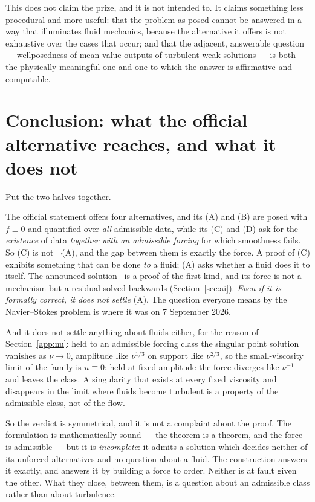\documentclass[11pt]{article}
\begin{document}
This does not claim the prize, and it is not intended to. It claims something less procedural and
more useful: that the problem as posed cannot be answered in a way that illuminates fluid mechanics,
because the alternative it offers is not exhaustive over the cases that occur; and that the
adjacent, answerable question --- wellposedness of mean-value outputs of turbulent weak solutions
--- is both the physically meaningful one and one to which the answer is affirmative and
computable.


\appendix


\section{Conclusion: what the official alternative reaches, and what it does not}

Put the two halves together.

The official statement offers four alternatives, and its (A) and (B) are posed with $f\equiv0$ and
quantified over \emph{all} admissible data, while its (C) and (D) ask for the \emph{existence} of
data \emph{together with an admissible forcing} for which smoothness fails. So (C) is not
$\neg$(A), and the gap between them is exactly the force. A proof of (C) exhibits something that can
be done \emph{to} a fluid; (A) asks whether a fluid does it to itself. The announced
solution~\cite{openai} is a proof of the first kind, and its force is not a mechanism but a residual
solved backwards (Section~\ref{sec:ai}). \emph{Even if it is formally correct, it does not settle} (A).
The question everyone means by the Navier--Stokes problem is where it was on 7 September 2026.

And it does not settle anything about fluids either, for the reason of
Section~\ref{app:nu}: held to an admissible forcing class the singular point solution vanishes as
$\nu\to0$, amplitude like $\nu^{1/3}$ on support like $\nu^{2/3}$, so the small-viscosity limit of
the family is $u\equiv0$; held at fixed amplitude the force diverges like $\nu^{-1}$ and leaves the
class. A singularity that exists at every fixed viscosity and disappears in the limit where fluids
become turbulent is a property of the admissible class, not of the flow.

So the verdict is symmetrical, and it is not a complaint about the proof. The formulation is
mathematically sound --- the theorem is a theorem, and the force is admissible --- but it is
\emph{incomplete}: it admits a solution which decides neither of its unforced alternatives and no
question about a fluid. The construction answers it exactly, and answers it by building a force to
order. Neither is at fault given the other. What they close, between them, is a question about an
admissible class rather than about turbulence.
\end{document}

